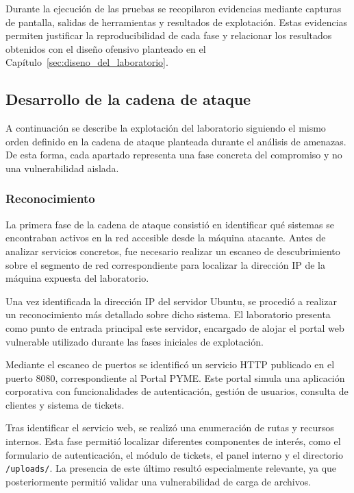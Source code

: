 Durante la ejecución de las pruebas se recopilaron evidencias mediante capturas de pantalla, salidas de herramientas y resultados de explotación. Estas evidencias permiten justificar la reproducibilidad de cada fase y relacionar los resultados obtenidos con el diseño ofensivo planteado en el Capítulo~\ref{sec:diseno_del_laboratorio}.


\subsection{Desarrollo de la cadena de ataque}

A continuación se describe la explotación del laboratorio siguiendo el mismo orden definido en la cadena de ataque planteada durante el análisis de amenazas. De esta forma, cada apartado representa una fase concreta del compromiso y no una vulnerabilidad aislada.


\subsubsection{Reconocimiento}

La primera fase de la cadena de ataque consistió en identificar qué sistemas se encontraban activos en la red accesible desde la máquina atacante. Antes de analizar servicios concretos, fue necesario realizar un escaneo de descubrimiento sobre el segmento de red correspondiente para localizar la dirección IP de la máquina expuesta del laboratorio.

Una vez identificada la dirección IP del servidor Ubuntu, se procedió a realizar un reconocimiento más detallado sobre dicho sistema. El laboratorio presenta como punto de entrada principal este servidor, encargado de alojar el portal web vulnerable utilizado durante las fases iniciales de explotación.

Mediante el escaneo de puertos se identificó un servicio HTTP publicado en el puerto 8080, correspondiente al Portal PYME. Este portal simula una aplicación corporativa con funcionalidades de autenticación, gestión de usuarios, consulta de clientes y sistema de tickets.

Tras identificar el servicio web, se realizó una enumeración de rutas y recursos internos. Esta fase permitió localizar diferentes componentes de interés, como el formulario de autenticación, el módulo de tickets, el panel interno y el directorio \texttt{/uploads/}. La presencia de este último resultó especialmente relevante, ya que posteriormente permitió validar una vulnerabilidad de carga de archivos.


